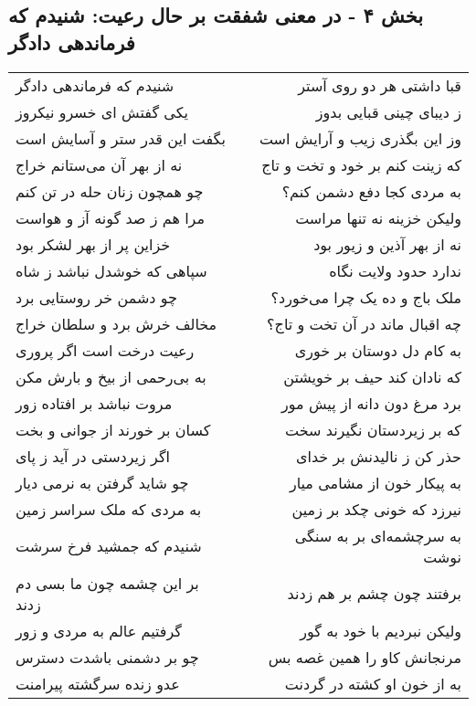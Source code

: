 \begin{center}
\section*{بخش ۴ - در معنی شفقت بر حال رعیت: شنیدم که فرماندهی دادگر}
\label{sec:004}
\begin{longtable}{l p{0.5cm} r}
شنیدم که فرماندهی دادگر
&&
قبا داشتی هر دو روی آستر
\\
یکی گفتش ای خسرو نیکروز
&&
ز دیبای چینی قبایی بدوز
\\
بگفت این قدر ستر و آسایش است
&&
وز این بگذری زیب و آرایش است
\\
نه از بهر آن می‌ستانم خراج
&&
که زینت کنم بر خود و تخت و تاج
\\
چو همچون زنان حله در تن کنم
&&
به مردی کجا دفع دشمن کنم؟
\\
مرا هم ز صد گونه آز و هواست
&&
ولیکن خزینه نه تنها مراست
\\
خزاین پر از بهر لشکر بود
&&
نه از بهر آذین و زیور بود
\\
سپاهی که خوشدل نباشد ز شاه
&&
ندارد حدود ولایت نگاه
\\
چو دشمن خر روستایی برد
&&
ملک باج و ده یک چرا می‌خورد؟
\\
مخالف خرش برد و سلطان خراج
&&
چه اقبال ماند در آن تخت و تاج؟
\\
رعیت درخت است اگر پروری
&&
به کام دل دوستان بر خوری
\\
به بی‌رحمی از بیخ و بارش مکن
&&
که نادان کند حیف بر خویشتن
\\
مروت نباشد بر افتاده زور
&&
برد مرغ دون دانه از پیش مور
\\
کسان بر خورند از جوانی و بخت
&&
که بر زیردستان نگیرند سخت
\\
اگر زیردستی در آید ز پای
&&
حذر کن ز نالیدنش بر خدای
\\
چو شاید گرفتن به نرمی دیار
&&
به پیکار خون از مشامی میار
\\
به مردی که ملک سراسر زمین
&&
نیرزد که خونی چکد بر زمین
\\
شنیدم که جمشید فرخ سرشت
&&
به سرچشمه‌ای بر به سنگی نوشت
\\
بر این چشمه چون ما بسی دم زدند
&&
برفتند چون چشم بر هم زدند
\\
گرفتیم عالم به مردی و زور
&&
ولیکن نبردیم با خود به گور
\\
چو بر دشمنی باشدت دسترس
&&
مرنجانش کاو را همین غصه بس
\\
عدو زنده سرگشته پیرامنت
&&
به از خون او کشته در گردنت
\\
\end{longtable}
\end{center}
